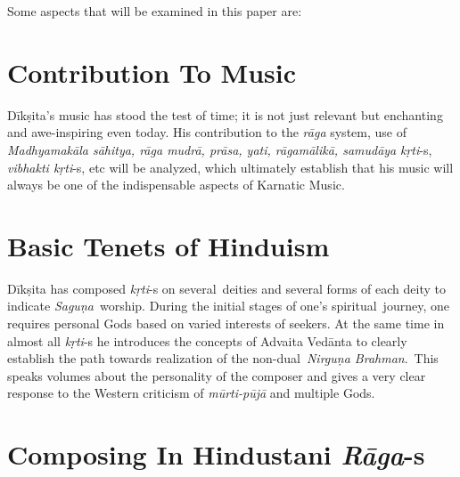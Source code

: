 Some aspects that will be examined in this paper are:

\vspace{-.3cm}

\section*{Contribution To Music}

Dīkṣita’s music has stood the test of time; it is not just relevant but enchanting and awe-inspiring even today. His contribution to the \textit{rāga} system, use of \textit{Madhyamakāla sāhitya, rāga mudrā, prāsa, yati, rāgamālikā, samudāya} \textit{kṛti}-s, \textit{vibhakti kṛti}-s, etc will be analyzed, which ultimately establish that his music will always be one of the indispensable aspects of Karnatic Music.

\vspace{-.3cm}

\section*{Basic Tenets of Hinduism}

Dīkṣita has composed \textit{kṛti}-s on several deities and several forms of each deity to indicate \textit{Saguṇa} worship. During the initial stages of one’s spiritual journey, one requires personal Gods based on varied interests of seekers. At the same time in almost all \textit{kṛti}-s he introduces the concepts of Advaita Vedānta to clearly establish the path towards realization of the non-dual \textit{Nirguṇa Brahman}.~This speaks volumes about the personality of the composer and gives a very clear response to the Western criticism of \textit{mūrti-pūjā} and multiple Gods.

\vspace{-.3cm}

\section*{Composing In Hindustani \textit{Rāga}-s}

